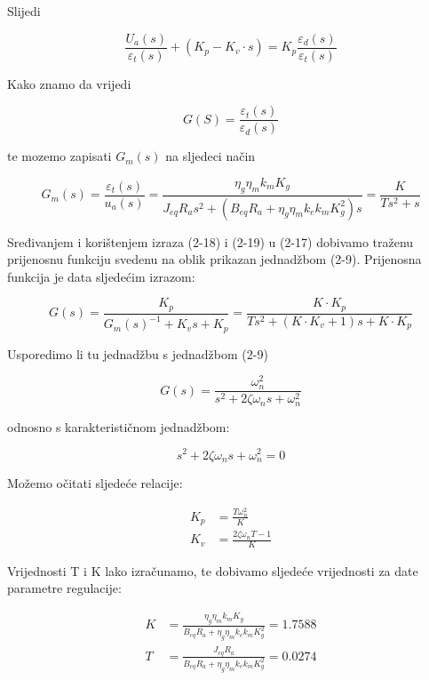 \documentclass[12pt,a4paper]{article}
\begin{document}
Slijedi


\begin{equation}
\frac{U_a(s)}{\varepsilon_t(s)} + (K_p - K_v \cdot s) = K_p \frac{\varepsilon_d(s)}{\varepsilon_t(s)} 
\end{equation}

Kako znamo da vrijedi

\begin{equation}
G(S) = \frac{\varepsilon_t(s)}{\varepsilon_d(s)}
\end{equation}

te mozemo zapisati $G_m(s)$ na sljedeci način

\begin{equation}
G_m(s)=\frac{\varepsilon_t(s)}{u_a(s)}=\frac{\eta_g\eta_mk_mK_g}{J_{eq}R_as^2 + (B_{eq}R_a+\eta_g\eta_mk_ek_mK_g^2)s} = \frac{K}{Ts^2+s}
\end{equation}

Sređivanjem i korištenjem izraza (2-18) i (2-19) u (2-17) dobivamo traženu prijenosnu funkciju svedenu na oblik prikazan jednadžbom (2-9). Prijenosna funkcija je data sljedećim izrazom:

\begin{equation}
G(s) = \frac{K_p}{G_m(s)^{-1} + K_vs + K_p} = \frac{K\cdot K_p}{Ts^2 + (K\cdot K_v + 1)s + K\cdot K_p}
\end{equation}

Usporedimo li tu jednadžbu s jednadžbom (2-9)

\begin{equation}
G(s) = \frac{\omega_n^2}{s^2+2\zeta\omega_ns+\omega_n^2}
\end{equation}

odnosno s karakterističnom jednadžbom:

\begin{equation}
s^2+2\zeta\omega_ns+\omega_n^2 = 0
\end{equation}


Možemo očitati sljedeće relacije:

\begin{subequations}
\begin{align}
	K_p &= \frac{T\omega_n^2}{K} \\
	K_v &= \frac{2\zeta\omega_nT -1}{K}
\end{align}
\end{subequations}

Vrijednosti T i K lako izračunamo, te dobivamo sljedeće vrijednosti za date parametre regulacije:


\begin{subequations}
\begin{align}
	K &= \frac{\eta_g\eta_mk_mK_g}{B_{eq}R_a+\eta_g\eta_mk_ek_mK_g^2} = 1.7588\\
	T &= \frac{J_{eq}R_a}{B_{eq}R_a+\eta_g\eta_mk_ek_mK_g^2} = 0.0274
\end{align}
\end{subequations}
\end{document}
